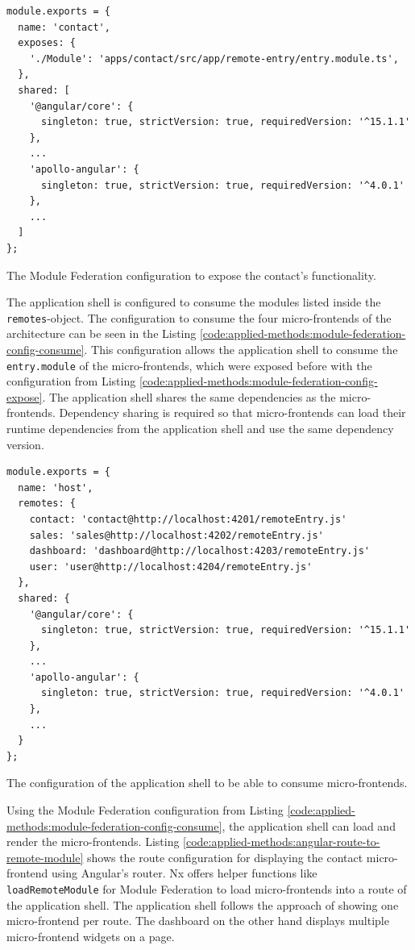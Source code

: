 \ifshowListings
\begin{listing}[H]
  \begin{verbatim}
module.exports = {
  name: 'contact',
  exposes: {
    './Module': 'apps/contact/src/app/remote-entry/entry.module.ts',
  },
  shared: [
    '@angular/core': {
      singleton: true, strictVersion: true, requiredVersion: '^15.1.1' 
    },
    ...
    'apollo-angular': { 
      singleton: true, strictVersion: true, requiredVersion: '^4.0.1' 
    },
    ...
  ]
};
  \end{verbatim}
  \caption{The Module Federation configuration to expose the contact's functionality.}\label{code:applied-methods:module-federation-config-expose}
\end{listing}
\fi

\noindent The application shell is configured to consume the modules listed inside the \texttt{remotes}-object. The configuration to consume the four micro-frontends of the architecture can be seen in the Listing \ref{code:applied-methods:module-federation-config-consume}. This configuration allows the application shell to consume the \texttt{entry.module} of the micro-frontends, which were exposed before with the configuration from Listing \ref{code:applied-methods:module-federation-config-expose}. The application shell shares the same dependencies as the micro-frontends. Dependency sharing is required so that micro-frontends can load their runtime dependencies from the application shell and use the same dependency version.

\ifshowListings
\begin{listing}[H]
  \begin{verbatim}
module.exports = {
  name: 'host',
  remotes: {
    contact: 'contact@http://localhost:4201/remoteEntry.js'
    sales: 'sales@http://localhost:4202/remoteEntry.js'
    dashboard: 'dashboard@http://localhost:4203/remoteEntry.js'
    user: 'user@http://localhost:4204/remoteEntry.js'
  },
  shared: {
    '@angular/core': {
      singleton: true, strictVersion: true, requiredVersion: '^15.1.1' 
    },
    ...
    'apollo-angular': { 
      singleton: true, strictVersion: true, requiredVersion: '^4.0.1' 
    },
    ...
  }
};
  \end{verbatim}
  \caption{The configuration of the application shell to be able to consume micro-frontends.}\label{code:applied-methods:module-federation-config-consume}
\end{listing}
\fi

\noindent Using the Module Federation configuration from Listing \ref{code:applied-methods:module-federation-config-consume}, the application shell can load and render the micro-frontends. Listing \ref{code:applied-methods:angular-route-to-remote-module} shows the route configuration for displaying the contact micro-frontend using Angular's router. Nx offers helper functions like \texttt{loadRemoteModule} for Module Federation to load micro-frontends into a route of the application shell. The application shell follows the approach of showing one micro-frontend per route. The dashboard on the other hand displays multiple micro-frontend widgets on a page.

